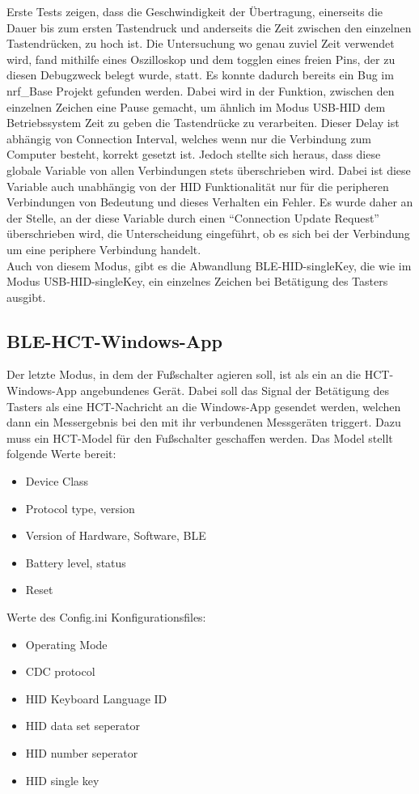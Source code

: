 Erste Tests zeigen, dass die Geschwindigkeit der Übertragung, einerseits die Dauer bis zum ersten Tastendruck und anderseits die Zeit zwischen den einzelnen Tastendrücken, zu hoch ist. Die Untersuchung wo genau zuviel Zeit verwendet wird, fand mithilfe eines Oszilloskop und dem togglen eines freien Pins, der zu diesen Debugzweck belegt wurde, statt. Es konnte dadurch bereits ein Bug im nrf\_Base Projekt gefunden werden. Dabei wird in der Funktion, zwischen den einzelnen Zeichen eine Pause gemacht, um ähnlich im Modus USB-\ac{HID} dem Betriebssystem Zeit zu geben die Tastendrücke zu verarbeiten. Dieser Delay ist abhängig von Connection Interval, welches wenn nur die Verbindung zum Computer besteht, korrekt gesetzt ist. Jedoch stellte sich heraus, dass diese globale Variable von allen Verbindungen stets überschrieben wird. Dabei ist diese Variable auch unabhängig von der \ac{HID} Funktionalität nur für die peripheren Verbindungen von Bedeutung und dieses Verhalten ein Fehler. Es wurde daher an der Stelle, an der diese Variable durch einen ``Connection Update Request'' überschrieben wird, die Unterscheidung eingeführt, ob es sich bei der Verbindung um eine periphere Verbindung handelt.\\
Auch von diesem Modus, gibt es die Abwandlung \ac{BLE}-\ac{HID}-singleKey, die wie im Modus USB-\ac{HID}-singleKey, ein einzelnes Zeichen bei Betätigung des Tasters ausgibt.


\subsection{BLE-HCT-Windows-App}
Der letzte Modus, in dem der Fußschalter agieren soll, ist als ein an die \ac{HCT}-Windows-App angebundenes Gerät. Dabei soll das Signal der Betätigung des Tasters als eine \ac{HCT}-Nachricht an die Windows-App gesendet werden, welchen dann ein Messergebnis bei den mit ihr verbundenen Messgeräten triggert. Dazu muss ein \ac{HCT}-Model für den Fußschalter geschaffen werden. Das Model stellt folgende Werte bereit:
\begin{itemize}
	\item Device Class
	\item Protocol type, version 
	\item Version of Hardware, Software, \ac{BLE}
	\item Battery level, status
	\item Reset 
\end{itemize}

Werte des Config.ini Konfigurationsfiles:
\begin{itemize}
	\item Operating Mode 
	\item CDC protocol 
	\item HID Keyboard Language ID 
	\item HID data set seperator 
	\item HID number seperator
	\item HID single key 
\end{itemize}

